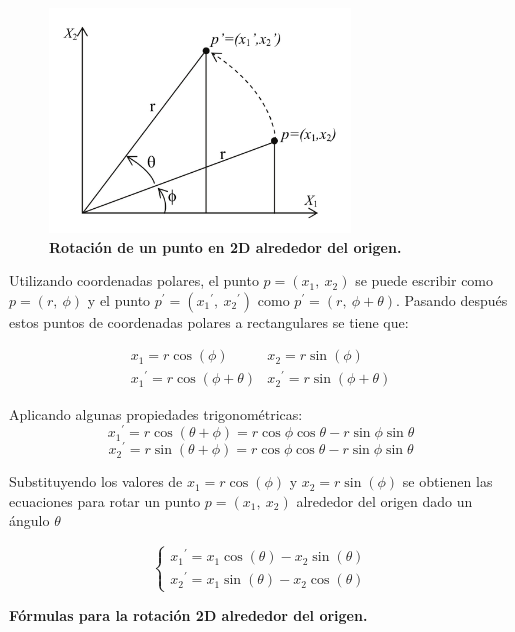 \begin{center}
\begin{figure}[h]
\includegraphics[width=8cm]{Img/GEO/geo-rotacion2d.jpg}
\centering
\caption{\textbf{\footnotesize{Rotación de un punto en 2D alrededor del origen.}}}
\end{figure}
\end{center}

Utilizando coordenadas polares, el punto $p = (x_{1}, \ x_{2})$ se puede escribir como $p = (r, \ \phi)$ y el punto $p^{\prime} = ({x_{1}}^{\prime},\ {x_{2}}^{\prime})$ como $p^{\prime} = (r, \ \phi + \theta)$. Pasando después estos puntos de coordenadas polares a rectangulares se tiene que:

$$
\begin{array}{rccl}
x_{1} = r \cos(\phi)  & x_{2} = r \sin(\phi)\\
{x_{1}}^{\prime} = r \cos(\phi + \theta)  & {x_{2}}^{\prime} = r \sin(\phi + \theta)
\end{array}
$$

Aplicando algunas propiedades trigonométricas:
$$
{x_{1}}^{\prime} = r \cos(\theta + \phi) = r \cos \phi \cos \theta - r \sin \phi \sin \theta
$$
$$
{x_{2}}^{\prime} = r \sin(\theta + \phi) = r \cos \phi \cos \theta - r \sin \phi \sin \theta
$$

Substituyendo los valores de $x_{1} = r \cos(\phi)$ y $x_{2} = r \sin(\phi)$ se obtienen las ecuaciones para rotar un punto $p = (x_{1}, \ x_{2})$ alrededor del origen dado un ángulo $\theta$

\begin{equation}
\begin{cases}
{x_{1}}^{\prime} = x_{1} \cos(\theta) -x_{2} \sin(\theta) \\ 
{x_{2}}^{\prime} = x_{1} \sin(\theta) -x_{2} \cos(\theta)
\end{cases}
\end{equation}

\begin{center}
\textbf{\footnotesize{Fórmulas para la rotación 2D alrededor del origen.}}
\end{center}

